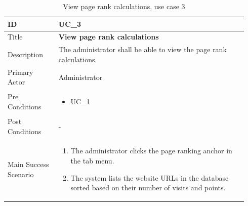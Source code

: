 \documentclass{scrartcl}
\begin{document}
\begin{table}[H]
  \caption{View page rank calculations, use case 3}
  \begin{tabular}{p{0.20\linewidth} | p{0.74\linewidth}}
    \toprule
    ID & UC\_3
    \\\midrule
    Title & \textbf{View page rank calculations}
    \\\hline
    Description & The administrator shall be able to view the page rank calculations.
    \\\hline
    Primary Actor & Administrator
    \\\hline
    Pre Conditions & {
                     \begin{itemize}
                     \item UC\_1
                     \end{itemize}
                     }\vspace*{-\baselineskip}
    \\\hline
    Post Conditions & -
    \\\hline
    Main Success Scenario & {
                            \begin{enumerate}
                            \item The administrator clicks the page ranking anchor in the tab menu.
                            \item The system lists the website URLs in the database sorted based on their number of visits and points.
                            \end{enumerate}
                            }\vspace*{-\baselineskip}
    \\\bottomrule
  \end{tabular}
\end{table}
\end{document}
